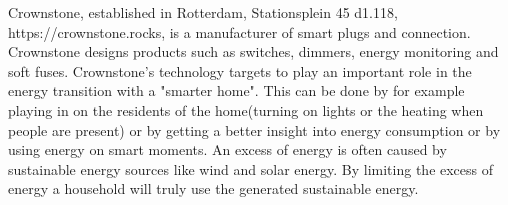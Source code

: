 Crownstone, established in Rotterdam, Stationsplein 45 d1.118, https://crownstone.rocks, is a manufacturer of smart plugs and connection. Crownstone designs products such as switches, dimmers, energy monitoring and soft fuses. Crownstone's technology targets to play an important role in the energy transition with a "smarter home". This can be done by for example playing in on the residents of the home(turning on lights or the heating when people are present) or by getting a better insight into energy consumption or by using energy on smart moments. An excess of energy is often caused by sustainable energy sources like wind and solar energy. By limiting the excess of energy a household will truly use the generated sustainable energy.